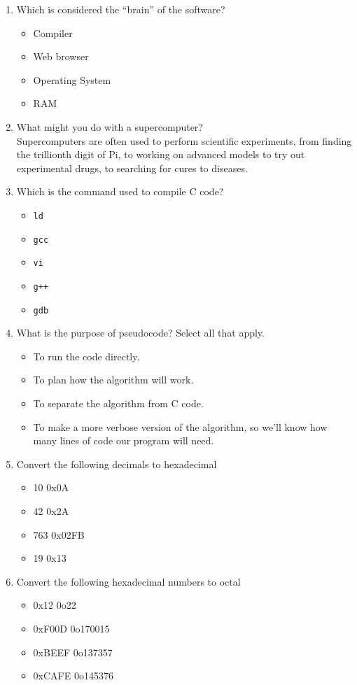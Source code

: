 \documentclass[letter,11pt]{article}
\newcommand*\tick{\item[\Checkmark]}
\newcommand*\fail{\item[\XSolidBrush]}
\begin{document}
\begin{enumerate}
    \item Which is considered the ``brain'' of the software?
    \begin{itemize}
        \fail Compiler
        \fail Web browser
        \tick Operating System
        \fail RAM
    \end{itemize}
    
    \item What might you do with a supercomputer? \\
    {\color{red}Supercomputers are often used to perform scientific experiments, from finding the trillionth digit of Pi, to working on advanced models to try out experimental drugs, to searching for cures to diseases.}
    
    \item Which is the command used to compile C code?
    \begin{itemize}
        \fail \texttt{ld}
        \tick \texttt{gcc}
        \fail \texttt{vi}
        \fail \texttt{g++}
        \fail \texttt{gdb}
    \end{itemize}
    
    \item What is the purpose of pseudocode? Select all that apply.
    \begin{itemize}
        \fail To run the code directly.
        \tick To plan how the algorithm will work.
        \tick To separate the algorithm from C code.
        \fail To make a more verbose version of the algorithm, so we'll know how many lines of code our program will need.
    \end{itemize}
    
    \item Convert the following decimals to hexadecimal
    \begin{itemize}
        \item 10 {\color{red}0x0A}
        \item 42 {\color{red}0x2A}
        \item 763 {\color{red}0x02FB}
        \item 19 {\color{red}0x13}
    \end{itemize}
    
    \item Convert the following hexadecimal numbers to octal
    \begin{itemize}
        \item 0x12 {\color{red}0o22}
        \item 0xF00D {\color{red}0o170015}
        \item 0xBEEF {\color{red}0o137357}
        \item 0xCAFE {\color{red}0o145376}
    \end{itemize}
    

\end{enumerate}
\end{document}
